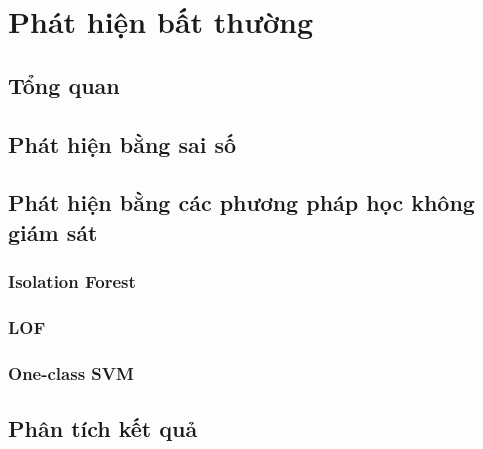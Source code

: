 \section{Phát hiện bất thường}
\subsection{Tổng quan}
\subsection{Phát hiện bằng sai số}
\subsection{Phát hiện bằng các phương pháp học không giám sát}
\subsubsection{Isolation Forest}
\subsubsection{LOF}
\subsubsection{One-class SVM}
\subsection{Phân tích kết quả}
